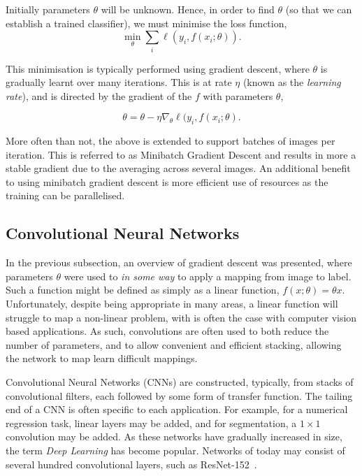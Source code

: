 \noindent Initially parameters $\theta$ will be unknown. Hence, in
order to find $\theta$ (so that we can establish a trained
classifier), we must minimise the loss function,
\begin{equation}
  \min_\theta \sum_i \ell(y_i, f(x_i ; \theta)) .
\end{equation}



\noindent This minimisation is typically performed using gradient
descent, where $\theta$ is gradually learnt over many iterations. This
is at rate $\eta$ (known as the \textit{learning rate}), and is
directed by the gradient of the $f$ with parameters $\theta$,

\begin{equation}
  \theta = \theta - \eta \nabla_\theta \ell(y_i, f(x_i ; \theta) .
  \end{equation}

More often than not, the above is extended to support batches of
images per iteration. This is referred to as Minibatch Gradient
Descent and results in more a stable gradient due to the averaging
across several images. An additional benefit to using minibatch
gradient descent is more efficient use of resources as the training
can be parallelised.

\subsection{Convolutional Neural Networks}

In the previous subsection, an overview of gradient descent was
presented, where parameters $\theta$ were used to \textit{in some way}
to apply a mapping from image to label. Such a function might be
defined as simply as a linear function, $f(x;\theta) = \theta
x$. Unfortunately, despite being appropriate in many areas, a linear
function will struggle to map a non-linear problem, with is often the
case with computer vision based applications. As such, convolutions
are often used to both reduce the number of parameters, and to allow
convenient and efficient stacking, allowing the network to map learn
difficult mappings.

Convolutional Neural Networks (CNNs) are constructed, typically, from
stacks of convolutional filters, each followed by some form of
transfer function. The tailing end of a CNN is often specific to each
application. For example, for a numerical regression task, linear
layers may be added, and for segmentation, a $1\times 1$ convolution
may be added. As these networks have gradually increased in size, the
term \textit{Deep Learning} has become popular. Networks of today may
consist of several hundred convolutional layers, such as
ResNet-152~\cite{he2015deep}.

